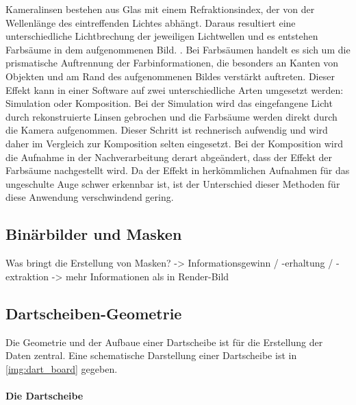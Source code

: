 Kameralinsen bestehen aus Glas mit einem Refraktionsindex, der von der Wellenlänge des eintreffenden Lichtes abhängt. Daraus resultiert eine unterschiedliche Lichtbrechung der jeweiligen Lichtwellen und es entstehen Farbsäume in dem aufgenommenen Bild. \cite{lens_distortion, camera_everything}. Bei Farbsäumen handelt es sich um die prismatische Auftrennung der Farbinformationen, die besonders an Kanten von Objekten und am Rand des aufgenommenen Bildes verstärkt auftreten. Dieser Effekt kann in einer Software auf zwei unterschiedliche Arten umgesetzt werden: Simulation oder Komposition. Bei der Simulation wird das eingefangene Licht durch rekonstruierte Linsen gebrochen und die Farbsäume werden direkt durch die Kamera aufgenommen. Dieser Schritt ist rechnerisch aufwendig und wird daher im Vergleich zur Komposition selten eingesetzt. Bei der Komposition wird die Aufnahme in der Nachverarbeitung derart abgeändert, dass der Effekt der Farbsäume nachgestellt wird. Da der Effekt in herkömmlichen Aufnahmen für das ungeschulte Auge schwer erkennbar ist, ist der Unterschied dieser Methoden für diese Anwendung verschwindend gering.


\subsection{Binärbilder und Masken}
\label{sec:masken}

Was bringt die Erstellung von Masken? -> Informationsgewinn / -erhaltung / -extraktion -> mehr Informationen als in Render-Bild

\todo{}


\subsection{Dartscheiben-Geometrie}  %
\label{sec:dartscheiben_geometrie}

Die Geometrie und der Aufbaue einer Dartscheibe ist für die Erstellung der Daten zentral. Eine schematische Darstellung einer Dartscheibe ist in \autoref{img:dart_board} gegeben.

\paragraph{Die Dartscheibe}

